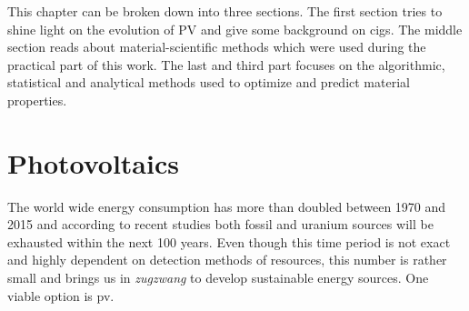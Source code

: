 
This chapter can be broken down into three sections. 
The first section tries to shine light on the evolution of PV and give some background on \gls{cigs}.
The middle section reads about material-scientific methods which were used during the practical part of this work. 
The last and third part focuses on the algorithmic, statistical and analytical methods used to optimize and predict material properties. 

\section{Photovoltaics}
The world wide energy consumption has more than doubled between 1970 and 2015\cite{BP2017} 
and according to recent studies both fossil\cite{BGR2017} and uranium sources\cite{Uran2006} 
will be exhausted within the next 100 years. 
Even though this time period is not exact and highly dependent on detection methods of resources, 
this number is rather small and brings us in \textit{zugzwang} to develop sustainable energy sources. 
One viable option is \gls{pv}.

